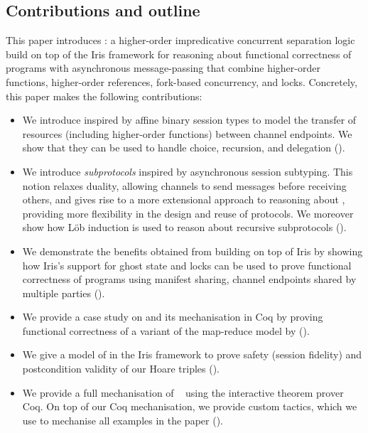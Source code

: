 \subsection{Contributions and outline}

This paper introduces \textbf{}: a higher-order impredicative concurrent
separation logic build on top of the Iris framework for reasoning about
functional correctness of programs with asynchronous message-passing that combine
higher-order functions, higher-order references, fork-based concurrency, and locks.
Concretely, this paper makes the following contributions:

\begin{itemize}
\item We introduce \emph{\pname} inspired by affine binary session types to
  model the transfer of resources (including higher-order functions) between
  channel endpoints.
  We show that they can be used to handle choice, recursion, and delegation
  ().
\item We introduce \emph{subprotocols} inspired by asynchronous session
  subtyping.
  This notion relaxes duality, allowing channels to send
  messages before receiving others, and gives rise to a more extensional
  approach to reasoning about \pname, providing more flexibility in the
  design and reuse of protocols.
  We moreover show how L\"ob induction is used to reason about recursive subprotocols
  ().
\item We demonstrate the benefits obtained from building \lname on top of Iris
  by showing how Iris's support for ghost state and locks can be used to prove
  functional correctness of programs using manifest
  sharing, \ie channel endpoints shared by multiple parties ().
\item We provide a case study on \lname and its mechanisation in Coq by proving
  functional correctness of a variant of the
  map-reduce model by \citet{dean-OSDI2004} ().
\item We give a model of \pname in the Iris framework to prove
  safety (\ie session fidelity) and postcondition
  validity of our Hoare triples ().
\item We provide a full mechanisation of \lname~\cite{actris_coq}
  using the interactive theorem prover Coq.
  On top of our Coq mechanisation, we provide custom tactics, which we use to mechanise all
  examples in the paper ().
\end{itemize}

